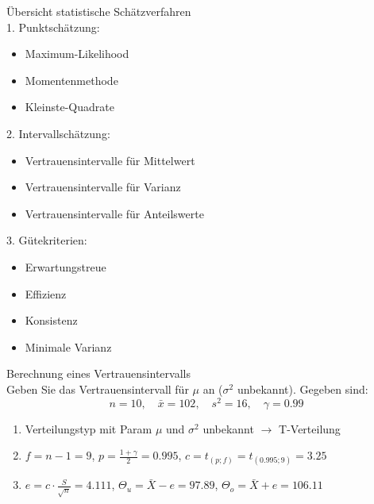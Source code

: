 \begin{concept}{Übersicht statistische Schätzverfahren}\\
1. Punktschätzung:
   \begin{itemize}
     \item Maximum-Likelihood
     \item Momentenmethode
     \item Kleinste-Quadrate
   \end{itemize}

2. Intervallschätzung:
   \begin{itemize}
     \item Vertrauensintervalle für Mittelwert
     \item Vertrauensintervalle für Varianz
     \item Vertrauensintervalle für Anteilswerte
   \end{itemize}

3. Gütekriterien:
   \begin{itemize}
     \item Erwartungstreue
     \item Effizienz
     \item Konsistenz
     \item Minimale Varianz
   \end{itemize}
\end{concept}


\begin{example}{Berechnung eines Vertrauensintervalls}\\
Geben Sie das Vertrauensintervall für $\mu$ an ($\sigma^2$ unbekannt). Gegeben sind:
$$
n=10, \quad \bar{x}=102, \quad s^2=16, \quad \gamma=0.99
$$

\begin{enumerate}
  \item Verteilungstyp mit Param $\mu$ und $\sigma^2$ unbekannt $\rightarrow$ T-Verteilung
  \item $f=n-1=9$, $p=\frac{1+\gamma}{2}=0.995$, $c=t_{(p;f)}=t_{(0.995;9)}=3.25$
  \item $e=c \cdot \frac{S}{\sqrt{n}}=4.111$, $\Theta_u=\bar{X}-e=97.89$, $\Theta_o=\bar{X}+e=106.11$
\end{enumerate}
\end{example}

